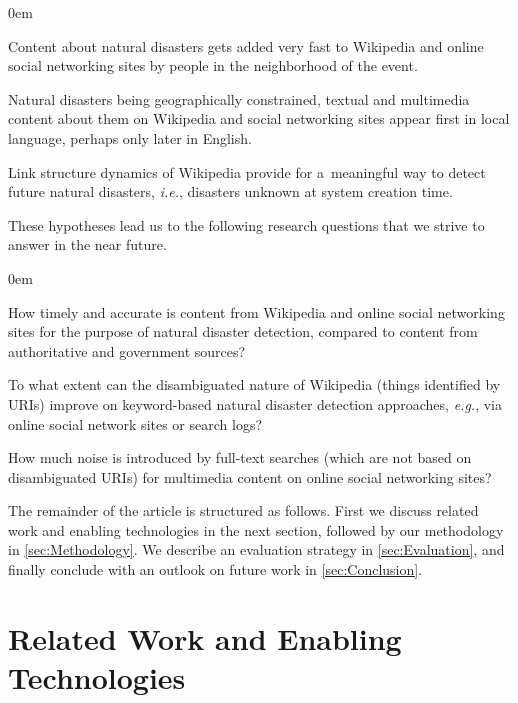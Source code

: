 \documentclass[letterpaper]{article}
\begin{document}
\begin{description}
  \itemsep0em
  \item[$\mathbb{H}1$] Content about natural disasters
    gets added very fast to Wikipedia and online social networking sites
    by people in the neighborhood of the event.
  \item[$\mathbb{H}2$] Natural disasters being geographically
    constrained, textual and multimedia content about them
    on Wikipedia and social networking sites
    appear first in local language,
    perhaps only later in English.
  \item[$\mathbb{H}3$] Link structure dynamics of Wikipedia
    provide for a~meaningful way to detect future
    natural disasters, \emph{i.e.}, disasters unknown at system creation time.
\end{description}

\noindent These hypotheses lead us to the following research questions
that we strive to answer in the near future.

\begin{description}
  \itemsep0em
  \item[$\mathbb{Q}1$] How timely and accurate is content from Wikipedia
    and online social networking sites
    for the purpose of natural disaster detection,
    compared to content from authoritative and government sources?
  \item[$\mathbb{Q}2$] To what extent can the disambiguated nature of Wikipedia
    (things identified by URIs) improve on keyword-based natural disaster detection approaches,
    \emph{e.g.}, via online social network sites or search logs?
  \item[$\mathbb{Q}3$] How much noise is introduced by full-text searches
    (which are not based on disambiguated URIs)
    for multimedia content on online social networking sites?
\end{description}


The remainder of the article is structured as follows.
First we discuss related work and enabling technologies in the next section,
followed by our methodology in \cref{sec:Methodology}.
We describe an evaluation strategy in \cref{sec:Evaluation},
and finally conclude with an outlook on future work in \cref{sec:Conclusion}.

\section{Related Work and Enabling Technologies}
\label{sec:RelatedWork}
\end{document}
